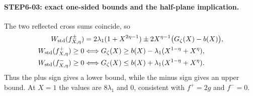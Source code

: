 \paragraph{STEP6-03: exact one-sided bounds and the half-plane implication.}
The two reflected cross sums coincide, so
\begin{align}
 W_{\rm std}(f^\pm_{X,\eta})
 &=2\lambda_1(1+X^{2\eta-1})
   \pm2X^{\eta-1}\bigl(G_\zeta(X)-b(X)\bigr),\label{eq:WeilGz}\\
 W_{\rm std}(f^+_{X,\eta})\ge0
 &\Longleftrightarrow G_\zeta(X)\ge b(X)-\lambda_1(X^{1-\eta}+X^\eta),\label{eq:WeilLower}\\
 W_{\rm std}(f^-_{X,\eta})\ge0
 &\Longleftrightarrow G_\zeta(X)\le b(X)+\lambda_1(X^{1-\eta}+X^\eta).\label{eq:WeilUpper}
\end{align}
Thus the plus sign gives a lower bound, while the minus sign gives an upper bound. At $X=1$ the values are $8\lambda_1$ and $0$, consistent with $f^+=2g$ and $f^-=0$.

